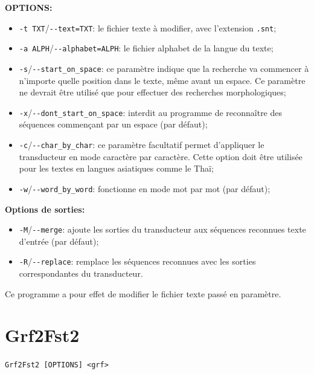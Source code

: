 \bigskip
\noindent \textbf{OPTIONS:}
\begin{itemize}
  \item \verb+-t TXT+/\verb+--text=TXT+: le fichier texte à modifier, avec l’extension \verb+.snt+;
  
  \item \verb+-a ALPH+/\verb+--alphabet=ALPH+: le fichier alphabet de la langue du
  texte;

  \item \verb+-s+/\verb+--start_on_space+: ce paramètre indique que la recherche va commencer à
  	  n'importe quelle position dans le texte, même avant un espace. Ce paramètre ne devrait
  	  être utilisé que pour effectuer des recherches morphologiques;
  	  
  \item \verb+-x+/\verb+--dont_start_on_space+: interdit au programme de 
  	  reconnaître des séquences commençant par un espace (par défaut);
  
  \item \verb+-c+/\verb+--char_by_char+: ce paramètre facultatif permet d’appliquer le transducteur
  en mode caractère par caractère. Cette option doit être utilisée pour les textes en  langues
  asiatiques comme le Thaï;

  \item \verb+-w+/\verb+--word_by_word+: fonctionne en mode mot par mot (par défaut);
\end{itemize}

\bigskip
\noindent \textbf{Options de sorties:}
\begin{itemize}
\item \verb+-M+/\verb+--merge+: ajoute les sorties du transducteur aux séquences reconnues texte
	d'entrée (par défaut);
\item \verb+-R+/\verb+--replace+: remplace les séquences reconnues avec les sorties correspondantes
	du transducteur.
\end{itemize}

\bigskip
\noindent Ce programme a pour effet de modifier le fichier texte passé en paramètre.







\section{Grf2Fst2}
\verb+Grf2Fst2 [OPTIONS] <grf>+

